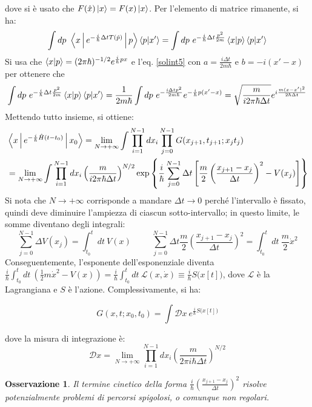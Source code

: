 \documentclass[11pt, a4paper]{scrartcl} %
\numberwithin{equation}{subsection}
\theoremstyle{style2}
\newtheorem{osservazione}{Osservazione}[section]
\theoremstyle{style1}
\newenvironment{boxenv}[1][]{
    \begin{eqbox}[#1]
    }{
   \end{eqbox}
}
\begin{document}
dove si \`e usato che $F(\hat{x}) \ket{x} = F(x) \ket{x} $.
Per l'elemento di matrice rimanente, si ha:
\[
\int dp \ \Braket{x|e^{-\frac{i}{\hbar } \Delta t T(\hat{p})} |p} \braket{p|x'} = \int dp \ e^{-\frac{i}{\hbar }\Delta t \frac{p^2}{2m}} \braket{x|p} \braket{p|x'} 
\] 
Si usa che $\braket{x|p} = (2\pi\hbar )^{- 1 / 2} e^{\frac{i}{\hbar }px} $ e l'eq. \ref{solint5} con $a = \frac{i\Delta  t}{2m \hbar }$ e $b = - i (x' -x)$ per ottenere che
\[
\int dp \ e^{-\frac{i}{\hbar }\Delta t \frac{p^2}{2m}} \braket{x|p} \braket{p|x'} = \frac{1}{2m\hbar }\int dp \ e^{-\frac{i\Delta  t p^2}{2m\hbar }} e^{-\frac{i}{\hbar }p(x'-x)} = \sqrt{\frac{m}{i 2 \pi \hbar  \Delta t}} e^{i \frac{m (x-x')^2}{2\hbar \Delta t}} 
\] 
Mettendo tutto insieme, si ottiene:
\begin{equation*}
	\begin{split}
		&\Braket{x|e^{-\frac{i}{\hbar }\hat{H}(t-t_0)} |x_0}  = \lim_{N\to +\infty} \int \prod _{i=1} ^{N-1} dx_i \prod _{j=0} ^{N-1} G(x_{j+1}, t_{j+1} ; x_j t_j)\\
								     &= \lim_{N \to +\infty} \int \prod_{i=1} ^{N-1} dx_i \left(\frac{m}{i 2\pi \hbar  \Delta t}\right) ^{N / 2} \exp \left\{ \frac{i}{\hbar }\sum_{j=0}^{N-1} \Delta t \left[ \frac{m}{2} \left(\frac{x_{j+1} - x_j}{\Delta t}\right) ^2 -V(x_j)  \right]  \right\} 
	\end{split}
\end{equation*}
Si nota che $N\to +\infty$ corrisponde a mandare $\Delta  t \to 0$ perch\'e l'intervallo \`e fissato, quindi deve diminuire l'ampiezza di ciascun sotto-intervallo; in questo limite, le somme diventano degli integrali:
\[
\sum_{j=0}^{N-1} \Delta  V(x_j) = \int_{t_0} ^t dt \ V(x) \hspace{1cm} \sum_{j=0}^{N-1} \Delta t \frac{m}{2} \left(\frac{x_{j+1} -x_j}{\Delta t}\right) ^2 = \int_{t_0} ^t dt \ \frac{m}{2}\dot{x}^2
\] 
Conseguentemente, l'esponente dell'esponenziale diventa $\frac{i}{\hbar } \int_{t_0} ^t dt \ \left(\frac{1}{2}m\dot{x}^2 - V(x)\right) = \frac{i}{\hbar }\int_{t_0} ^t dt \ \mathcal{L} (x,\dot{x})\equiv \frac{i}{\hbar }S\big(x[t]\big)$, dove $\mathcal{L}$ \`e la Lagrangiana e $S$ \`e l'azione.
Complessivamente, si ha:
\begin{boxenv}[]
\begin{equation}
	G(x,t;x_0,t_0) = \int \mathcal{D} x \ e^{\frac{i}{\hbar }S\big(x[t]\big)} 
\end{equation}
\end{boxenv}
\noindent dove la misura di integrazione \`e:
\begin{equation}
	\mathcal{D} x = \lim_{N \to +\infty} \prod_{i=1} ^{N-1} dx_i \left(\frac{m}{2\pi i \hbar \Delta t}\right) ^{N / 2} 
\end{equation}
\begin{osservazione}
Il termine cinetico della forma $\frac{i}{\hbar }\left(\frac{x_{j+1} - x_j}{\Delta t}\right) ^2$ risolve potenzialmente problemi di percorsi spigolosi, o comunque non regolari.
\end{osservazione}
\end{document}
